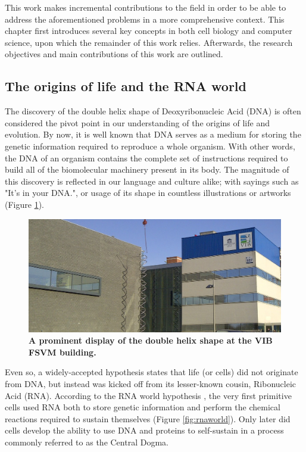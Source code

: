 This work makes incremental contributions to the field in order to be able to address the aforementioned problems in a more comprehensive context. This chapter first introduces several key concepts in both cell biology and computer science, upon which the remainder of this work relies. Afterwards, the research objectives and main contributions of this work are outlined.

\subsection{The origins of life and the RNA world}
The discovery of the double helix shape of Deoxyribonucleic Acid (DNA) \cite{watson_molecularstructurenucleic_1953} is often considered the pivot point in our understanding of the origins of life and evolution. By now, it is well known that DNA serves as a medium for storing the genetic information required to reproduce a whole organism. With other words, the DNA of an organism contains the complete set of instructions required to build all of the biomolecular machinery present in its body.
The magnitude of this discovery is reflected in our language and culture alike; with sayings such as "It's in your DNA.", or usage of its shape in countless illustrations or artworks (Figure \ref{fig:fsvm}).


\begin{figure}[htb!]
	\centering\includegraphics[width=.5\linewidth]{fig/fsvm3} %
	\caption{
		\textbf{A prominent display of the double helix shape at the VIB FSVM building.}
	}
	\label{fig:fsvm}
\end{figure}

Even so, a widely-accepted hypothesis states that life (or cells) did not originate from DNA, but instead was kicked off from its lesser-known cousin, Ribonucleic Acid (RNA). According to the RNA world hypothesis \cite{alberts_rnaworldorigins_2002}, the very first primitive cells used RNA both to store genetic information and perform the chemical reactions required to sustain themselves (Figure \ref{fig:rnaworld}). Only later did cells develop the ability to use DNA and proteins to self-sustain in a process commonly referred to as the Central Dogma.


